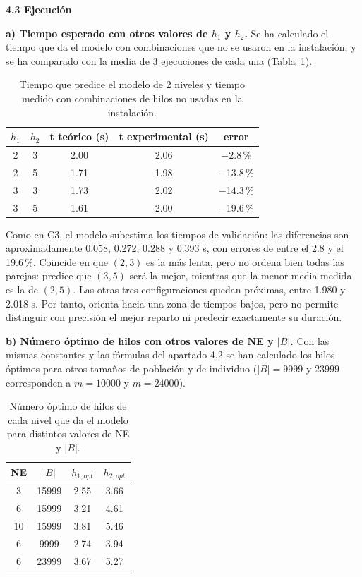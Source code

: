 \documentclass[12pt]{article}
\begin{document}
\begin{enumerate}
\medskip
\noindent\textbf{4.3 Ejecución}\par
\smallskip

\textbf{a) Tiempo esperado con otros valores de $h_1$ y $h_2$.} Se ha calculado el tiempo que da el modelo con combinaciones que no se usaron en la instalación, y se ha comparado con la media de 3 ejecuciones de cada una (Tabla~\ref{tab:c4_prediccion}).

\begin{table}[htbp]
\centering
\begin{tabular}{cc|ccc}
\toprule
\textbf{$h_1$} & \textbf{$h_2$} & \textbf{t teórico (s)} & \textbf{t experimental (s)} & \textbf{error} \\
\midrule
2 & 3 & 2.00 & 2.06 & $-$2.8\,\% \\
2 & 5 & 1.71 & 1.98 & $-$13.8\,\% \\
3 & 3 & 1.73 & 2.02 & $-$14.3\,\% \\
3 & 5 & 1.61 & 2.00 & $-$19.6\,\% \\
\bottomrule
\end{tabular}
\caption{Tiempo que predice el modelo de 2 niveles y tiempo medido con combinaciones de hilos no usadas en la instalación.}
\label{tab:c4_prediccion}
\end{table}

Como en C3, el modelo subestima los tiempos de validación: las diferencias son aproximadamente 0.058, 0.272, 0.288 y 0.393 s, con errores de entre el 2.8 y el 19.6\,\%. Coincide en que $(2,3)$ es la más lenta, pero no ordena bien todas las parejas: predice que $(3,5)$ será la mejor, mientras que la menor media medida es la de $(2,5)$. Las otras tres configuraciones quedan próximas, entre 1.980 y 2.018 s. Por tanto, orienta hacia una zona de tiempos bajos, pero no permite distinguir con precisión el mejor reparto ni predecir exactamente su duración.

\textbf{b) Número óptimo de hilos con otros valores de NE y $|B|$.} Con las mismas constantes y las fórmulas del apartado 4.2 se han calculado los hilos óptimos para otros tamaños de población y de individuo ($|B| = 9999$ y $23999$ corresponden a $m = 10000$ y $m = 24000$).

\begin{table}[htbp]
\centering
\begin{tabular}{cc|cc}
\toprule
\textbf{NE} & \textbf{$|B|$} & \textbf{$h_{1,opt}$} & \textbf{$h_{2,opt}$} \\
\midrule
3 & 15999 & 2.55 & 3.66 \\
6 & 15999 & 3.21 & 4.61 \\
10 & 15999 & 3.81 & 5.46 \\
6 & 9999 & 2.74 & 3.94 \\
6 & 23999 & 3.67 & 5.27 \\
\bottomrule
\end{tabular}
\caption{Número óptimo de hilos de cada nivel que da el modelo para distintos valores de NE y $|B|$.}
\label{tab:c4_otros}
\end{table}


\end{enumerate}
\end{document}
